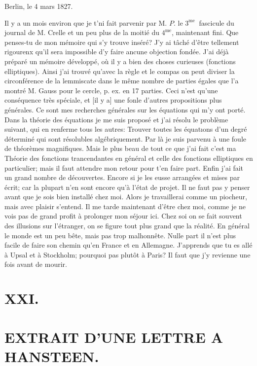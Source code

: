 \documentclass{article}
\begin{document}
Berlin, le 4 mars 1827.

Il y a un mois environ que je t'ni fait parvenir par M. \(P\). le \(3^{\text {me }}\) fascicule du journal de M. Crelle et un peu plus de la moitié du \(4^{\mathrm{me}}\), maintenant fini. Que penses-tu de mon mémoire qui s'y trouve inséré? J'y ai tâché d'être tellement rigourenx qu'il sera impossible d'y faire ancune objection fondée. J'ai déjà préparé un mémoire développé, où il y a bien des choses curieuses (fonctions elliptiques). Ainsi j'ai trouvé qu'avec la règle et le compas on peut diviser la circonférence de la lemmiscate dans le même nombre de parties égales que l'a montré M. Gauss pour le cercle, p. ex. en 17 parties. Ceci n'est qu'une conséquence très spéciale, et [il y a] une fonle d'autres propositions plus générales. Ce sont mes recherches générales sur les équations qui m'y ont porté. Dans la théorie des équations je me suis proposé et j'ai résolu le problème suivant, qui en renferme tous les autres: Trouver toutes les équatıons d'un degré déterminé qui sont résolubles algébriquement. Par là je suis parvenu à une foule de théorèmes magnifiques. Mais le plus beau de tout ce que j'ai fait c'est ma Théorie des fonctions trancendantes en général et celle des fonctions elliptiques en particulier; mais il faut attendre mon retour pour t'en faire part. Enfin j'ai fait un grand nombre de découvertes. Encore si je les eusse arrangées et mises par écrit; car la plupart n'en sont encore qu'à l'état de projet. Il ne faut pas y penser avant que je sois bien installé chez moi. Alors je travaillerai comme un piocheur, mais avec plaisir s'entend. Il me tarde maintenant d'être chez moi, comme je ne vois pas de grand profit à prolonger mon séjour ici. Chez soi on se fait souvent des illusions sur l'étranger, on se figure tout plus grand que la réalité. En général le monde est un peu bête, mais pas trop malhonnête. Nulle part il n'est plus facile de faire son chemin qu'en France et en Allemagne. J'apprends que tu es allé à Upsal et à Stockholm; pourquoi pas plutôt à Paris? Il faut que j'y revienne une fois avant de mourir.

\section*{XXI.}

\section*{EXTRAIT D'UNE LETTRE A HANSTEEN.}
\end{document}
